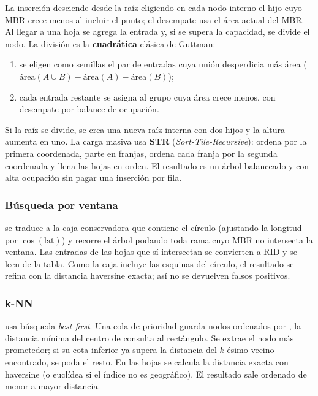 La inserción desciende desde la raíz eligiendo en cada nodo interno el hijo cuyo
MBR crece menos al incluir el punto; el desempate usa el área actual del MBR.
Al llegar a una hoja se agrega la entrada y, si se supera la capacidad, se
divide el nodo. La división es la \textbf{cuadrática} clásica de Guttman:

\begin{enumerate}
  \item se eligen como semillas el par de entradas cuya unión desperdicia más
        área (\(\text{área}(A \cup B) - \text{área}(A) - \text{área}(B)\));
  \item cada entrada restante se asigna al grupo cuya área crece menos, con
        desempate por balance de ocupación.
\end{enumerate}

Si la raíz se divide, se crea una nueva raíz interna con dos hijos y la altura
aumenta en uno. La carga masiva usa \textbf{STR} (\emph{Sort-Tile-Recursive}):
ordena por la primera coordenada, parte en franjas, ordena cada franja por la
segunda coordenada y llena las hojas en orden. El resultado es un árbol
balanceado y con alta ocupación sin pagar una inserción por fila.

\subsubsection{Búsqueda por ventana}

 se traduce a la caja conservadora que contiene el círculo
(ajustando la longitud por \(\cos(\text{lat})\)) y recorre el árbol podando toda
rama cuyo MBR no intersecta la ventana. Las entradas de las hojas que sí
intersectan se convierten a RID y se leen de la tabla. Como la caja incluye las
esquinas del círculo, el resultado se refina con la distancia haversine exacta;
así no se devuelven falsos positivos.

\subsubsection{k-NN}

 usa búsqueda \emph{best-first}. Una cola de prioridad guarda nodos
ordenados por , la distancia mínima del centro de consulta
al rectángulo. Se extrae el nodo más prometedor; si su cota inferior ya supera la
distancia del \(k\)-ésimo vecino encontrado, se poda el resto. En las hojas se
calcula la distancia exacta con haversine (o euclídea si el índice no es
geográfico). El resultado sale ordenado de menor a mayor distancia.

